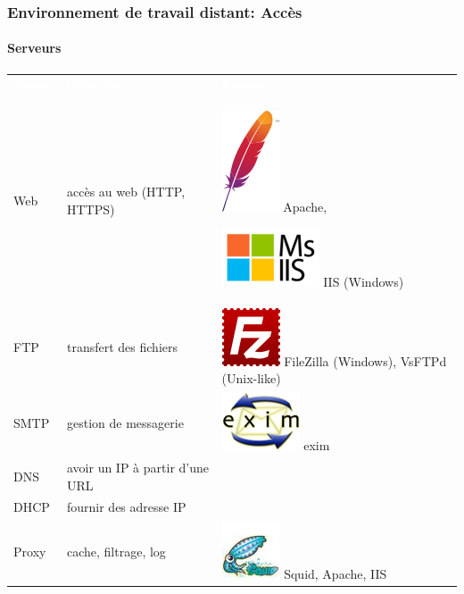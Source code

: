 \documentclass[xcolor=table]{beamer}
\begin{document}
\begin{frame}
\frametitle{Environnement de travail distant: Accès}
\framesubtitle{Serveurs}

	
\begin{tabular}{p{}p{}p{}}
	\rowcolor{darkblue}
	\textcolor{white}{Serveur} & \textcolor{white}{Utilisation} & \textcolor{white}{Exemple} \\
	
	Web & accès au web (HTTP, HTTPS) & 
	\includegraphics[height=.8cm]{../img/Bweb01-environnement/apache.png} Apache, 
	
	\includegraphics[height=.8cm]{../img/Bweb01-environnement/iis.png} IIS (Windows) \\
	
	FTP & transfert des fichiers & 
	\includegraphics[height=.8cm]{../img/Bweb01-environnement/filezilla.png} FileZilla (Windows), 
	VsFTPd (Unix-like) \\
	
	SMTP & gestion de messagerie & 
	\includegraphics[height=.8cm]{../img/Bweb01-environnement/exim.png} exim \\
	
	DNS & avoir un IP à partir d'une URL & \\
	
	DHCP & fournir des adresse IP & \\
	
	Proxy & cache, filtrage, log & 
	\includegraphics[height=.8cm]{../img/Bweb01-environnement/squid.jpg} Squid, Apache, IIS \\
	
\end{tabular}



\end{frame}
\end{document}
